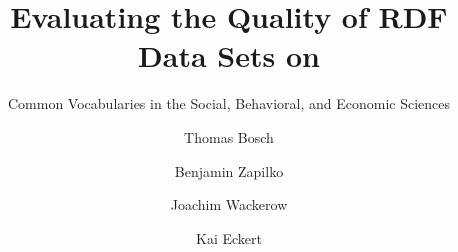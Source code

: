 \documentclass{llncs}
\begin{document}
\renewcommand{\arraystretch}{1.3}
%
%

\title{Evaluating the Quality of RDF Data Sets on}
\subtitle{Common Vocabularies in the Social, Behavioral, and Economic Sciences}


%
\author{Thomas Bosch \and Benjamin Zapilko \and Joachim Wackerow \and Kai Eckert}
%
\authorrunning{} %
%

\maketitle              %
\end{document}
